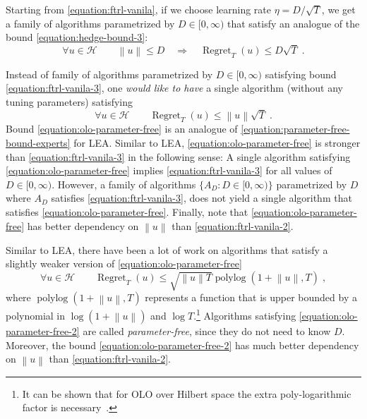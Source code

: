 \documentclass{colt2016} %
\DeclareMathOperator{\Regret}{Regret}
\DeclareMathOperator{\polylog}{polylog}
\renewcommand{\H}{\mathcal{H}}  %
\newcommand{\norm}[1]{\left\|{#1}\right\|}
\begin{document}
Starting from \eqref{equation:ftrl-vanila}, if we choose learning rate $\eta =
D/\sqrt{T}$, we get a family of algorithms parametrized by $D \in [0,\infty)$
that satisfy an analogue of the bound \eqref{equation:hedge-bound-3}:
\begin{equation}
\label{equation:ftrl-vanila-3}
\forall u \in \H \qquad \norm{u} \le D \quad  \Longrightarrow \quad \Regret_T(u) \le D \sqrt{T} \; .
\end{equation}

Instead of family of algorithms parametrized by $D \in [0,\infty)$ satisfying
bound \eqref{equation:ftrl-vanila-3}, one \emph{would like
to have} a single algorithm (without any tuning parameters) satisfying
\begin{equation}
\label{equation:olo-parameter-free}
\forall u \in \H \qquad \Regret_T(u) \le \norm{u} \sqrt{T} \; .
\end{equation}
Bound \eqref{equation:olo-parameter-free} is an analogue of
\eqref{equation:parameter-free-bound-experts} for LEA. Similar to LEA,
\eqref{equation:olo-parameter-free} is stronger than
\eqref{equation:ftrl-vanila-3} in the following sense: A single algorithm
satisfying \eqref{equation:olo-parameter-free} implies
\eqref{equation:ftrl-vanila-3} for all values of $D \in [0,\infty)$.  However,
a family of algorithms $\{A_D : D \in [0,\infty)\}$ parametrized by $D$ where
$A_D$ satisfies \eqref{equation:ftrl-vanila-3}, does not yield a single
algorithm that satisfies \eqref{equation:olo-parameter-free}.  Finally, note
that \eqref{equation:olo-parameter-free} has better dependency on $\norm{u}$
than \eqref{equation:ftrl-vanila-2}.

Similar to LEA, there have been a lot of work on algorithms
\citep{Streeter-McMahan-2012, Orabona-2013, McMahan-Abernethy-2013,
McMahan-Orabona-2014} that satisfy a slightly weaker version of
\eqref{equation:olo-parameter-free}
\begin{equation}
\label{equation:olo-parameter-free-2}
\forall u \in \H \qquad \Regret_T(u) \le \sqrt{\norm{u} T} \polylog(1 + \norm{u}, T) \; ,
\end{equation}
where $\polylog(1 + \norm{u}, T)$ represents a function that is upper bounded
by a polynomial in $\log(1+\norm{u})$ and $\log T$.\footnote{It can be shown
that for OLO over Hilbert space the extra poly-logarithmic factor is
necessary~\citep{McMahan-Abernethy-2013,Orabona-2013}.} Algorithms satisfying
\eqref{equation:olo-parameter-free-2} are called \emph{parameter-free}, since
they do not need to know $D$.  Moreover, the bound
\eqref{equation:olo-parameter-free-2} has much better dependency on $\norm{u}$
than \eqref{equation:ftrl-vanila-2}.
\end{document}
